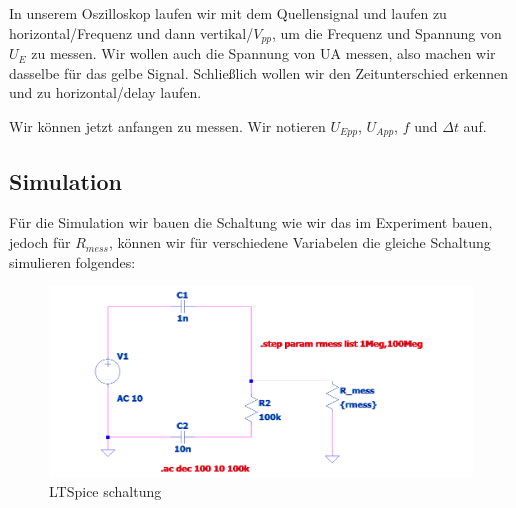 In unserem Oszilloskop laufen wir mit dem Quellensignal und laufen zu horizontal/Frequenz und dann vertikal/$V_{pp}$, um die Frequenz und Spannung von $U_E$ zu messen. Wir wollen auch die Spannung von UA messen, also machen wir dasselbe für das gelbe Signal. Schließlich wollen wir den Zeitunterschied erkennen und zu horizontal/delay laufen.

Wir können jetzt anfangen zu messen. Wir notieren $U_{Epp}$, $U_{App}$, $f$ und $\Delta t$ auf.
%
%
%
\begin{flushright}
  \textit{\autorA}
\end{flushright}
%
%
%
%
\subsection{Simulation}
\label{subsec:3_Simulation}
%
%
Für die Simulation wir bauen die Schaltung wie wir das im Experiment bauen, jedoch für $R_{mess}$, können wir für verschiedene Variabelen die gleiche Schaltung simulieren folgendes:
\begin{figure}[H]
  \centering
  \includegraphics[scale=.4]{src/ltspice2.png}
  \caption{LTSpice schaltung}
  \label{fig:Simulationplot}
\end{figure}
%
%
%
\begin{flushright}
  \textit{\autorA}
\end{flushright}
%
%
%
%